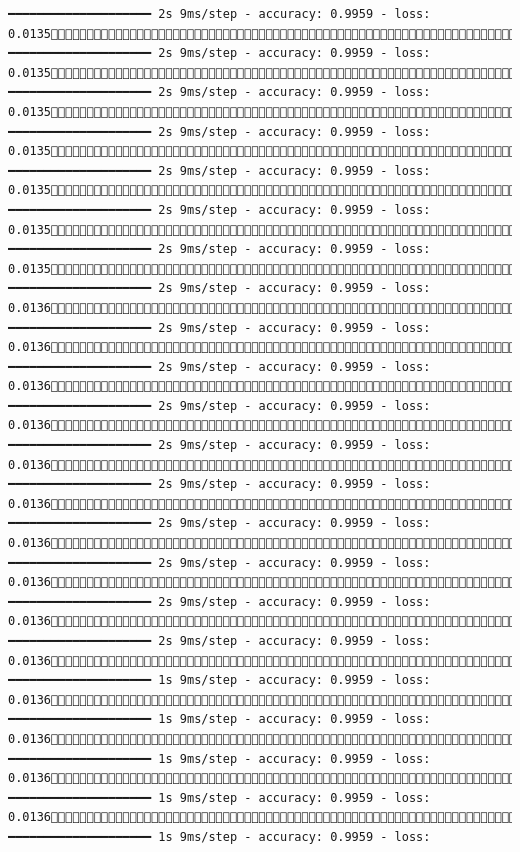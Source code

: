 \documentclass[
  letterpaper,
  DIV=11,
  numbers=noendperiod]{scrreprt}
\begin{document}
\begin{verbatim}
━━━━━━━━━━━━━━━━━━━━ 2s 9ms/step - accuracy: 0.9959 - loss: 0.01351555/1875 ━━━━━━━━━━━━━━━━━━━━ 2s 9ms/step - accuracy: 0.9959 - loss: 0.01351562/1875 ━━━━━━━━━━━━━━━━━━━━ 2s 9ms/step - accuracy: 0.9959 - loss: 0.01351568/1875 ━━━━━━━━━━━━━━━━━━━━ 2s 9ms/step - accuracy: 0.9959 - loss: 0.01351574/1875 ━━━━━━━━━━━━━━━━━━━━ 2s 9ms/step - accuracy: 0.9959 - loss: 0.01351580/1875 ━━━━━━━━━━━━━━━━━━━━ 2s 9ms/step - accuracy: 0.9959 - loss: 0.01351586/1875 ━━━━━━━━━━━━━━━━━━━━ 2s 9ms/step - accuracy: 0.9959 - loss: 0.01351593/1875 ━━━━━━━━━━━━━━━━━━━━ 2s 9ms/step - accuracy: 0.9959 - loss: 0.01361600/1875 ━━━━━━━━━━━━━━━━━━━━ 2s 9ms/step - accuracy: 0.9959 - loss: 0.01361606/1875 ━━━━━━━━━━━━━━━━━━━━ 2s 9ms/step - accuracy: 0.9959 - loss: 0.01361613/1875 ━━━━━━━━━━━━━━━━━━━━ 2s 9ms/step - accuracy: 0.9959 - loss: 0.01361619/1875 ━━━━━━━━━━━━━━━━━━━━ 2s 9ms/step - accuracy: 0.9959 - loss: 0.01361625/1875 ━━━━━━━━━━━━━━━━━━━━ 2s 9ms/step - accuracy: 0.9959 - loss: 0.01361631/1875 ━━━━━━━━━━━━━━━━━━━━ 2s 9ms/step - accuracy: 0.9959 - loss: 0.01361637/1875 ━━━━━━━━━━━━━━━━━━━━ 2s 9ms/step - accuracy: 0.9959 - loss: 0.01361643/1875 ━━━━━━━━━━━━━━━━━━━━ 2s 9ms/step - accuracy: 0.9959 - loss: 0.01361649/1875 ━━━━━━━━━━━━━━━━━━━━ 2s 9ms/step - accuracy: 0.9959 - loss: 0.01361655/1875 ━━━━━━━━━━━━━━━━━━━━ 1s 9ms/step - accuracy: 0.9959 - loss: 0.01361661/1875 ━━━━━━━━━━━━━━━━━━━━ 1s 9ms/step - accuracy: 0.9959 - loss: 0.01361668/1875 ━━━━━━━━━━━━━━━━━━━━ 1s 9ms/step - accuracy: 0.9959 - loss: 0.01361675/1875 ━━━━━━━━━━━━━━━━━━━━ 1s 9ms/step - accuracy: 0.9959 - loss: 0.01361681/1875 ━━━━━━━━━━━━━━━━━━━━ 1s 9ms/step - accuracy: 0.9959 - loss: 
\end{verbatim}
\end{document}
